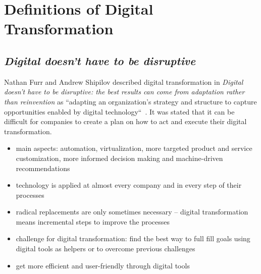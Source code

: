 \documentclass[a4]{scrartcl}
\begin{document}
	\section{Definitions of Digital Transformation} \label{sec:Sec1}







	\subsection{\textit{Digital doesn't have to be disruptive}} \label{disruptive}
	
	Nathan Furr and Andrew Shipilov described digital transformation in \textit{Digital doesn't have to be disruptive: the best results can come from adaptation rather than reinvention} as ``adapting an organization's strategy and structure to capture opportunities enabled by digital technology``~\cite[p. 96]{disruptive}.
	It was stated that it can be difficult for companies to create a plan on how to act and execute their digital transformation.
	
	\begin{itemize}
		\item main aspects: automation, virtualization, more targeted product and service customization, more informed decision making and machine-driven recommendations
		\item technology is applied at almost every company and in every step of their processes
		\item radical replacements are only sometimes necessary -- digital transformation means incremental steps to improve the processes
		\item challenge for digital transformation: find the best way to full fill goals using digital tools as helpers or to overcome previous challenges
		\item  get more efficient and user-friendly through digital tools
	\end{itemize}
\end{document}
